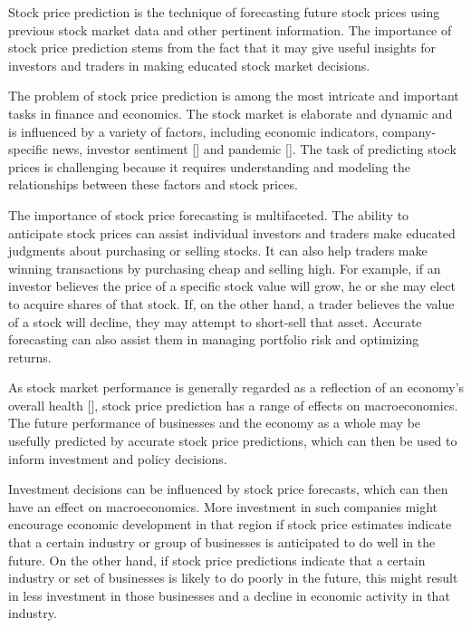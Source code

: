 \documentclass[a4paper]{article}
\begin{document}
Stock price prediction is the technique of forecasting future stock prices using previous stock market data and other pertinent information. The importance of stock price prediction stems from the fact that it may give useful insights for investors and traders in making educated stock market decisions.

The problem of stock price prediction is among the most intricate and important tasks in finance and economics. The stock market is elaborate and dynamic and is influenced by a variety of factors, including economic indicators, company-specific news, investor sentiment [\cite{barsky1993does, mitchell1994impact,qi1999economic,hondroyiannis2001macroeconomic}] and pandemic [\cite{mazur2021covid,baker2020unprecedented}]. The task of predicting stock prices is challenging because it requires understanding and modeling the relationships between these factors and stock prices.

The importance of stock price forecasting is multifaceted. The ability to anticipate stock prices can assist individual investors and traders make educated judgments about purchasing or selling stocks. It can also help traders make winning transactions by purchasing cheap and selling high. For example, if an investor believes the price of a specific stock value will grow, he or she may elect to acquire shares of that stock. If, on the other hand, a trader believes the value of a stock will decline, they may attempt to short-sell that asset. Accurate forecasting can also assist them in managing portfolio risk and optimizing returns.

As stock market performance is generally regarded as a reflection of an economy's overall health [\cite{masoud2013impact}], stock price prediction has a range of effects on macroeconomics. The future performance of businesses and the economy as a whole may be usefully predicted by accurate stock price predictions, which can then be used to inform investment and policy decisions.

Investment decisions can be influenced by stock price forecasts, which can then have an effect on macroeconomics. More investment in such companies might encourage economic development in that region if stock price estimates indicate that a certain industry or group of businesses is anticipated to do well in the future. On the other hand, if stock price predictions indicate that a certain industry or set of businesses is likely to do poorly in the future, this might result in less investment in those businesses and a decline in economic activity in that industry.
\end{document}

